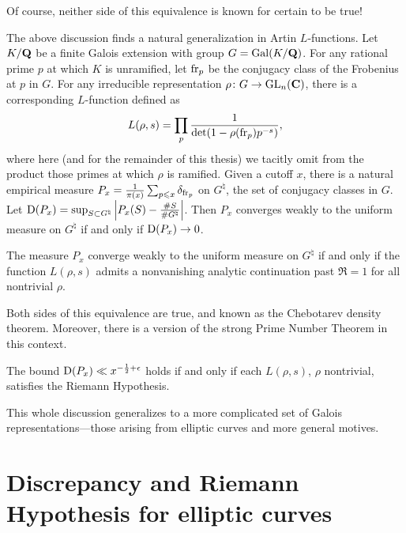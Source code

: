 Of course, neither side of this equivalence is known for certain to be true! 

The above discussion finds a natural generalization in Artin $L$-functions. 
Let $K/\mathbf{Q}$ be a finite Galois extension with group $G=\operatorname{Gal}(K/\mathbf{Q})$. For any 
rational prime $p$ at which $K$ is unramified, let $\mathrm{fr}_p$ be the conjugacy 
class of the Frobenius at $p$ in $G$. For any irreducible representation 
$\rho\colon G\to \operatorname{GL}_n(\mathbf{C})$, there is a corresponding $L$-function defined as 
\[
	L(\rho,s) = \prod_p \frac{1}{\det(1-\rho(\mathrm{fr}_p) p^{-s})} ,
\]
where here (and for the remainder of this thesis) we tacitly omit from the 
product those primes at which $\rho$ is ramified. Given a cutoff $x$, there is 
a natural empirical measure 
$P_x = \frac{1}{\pi(x)} \sum_{p\leqslant x} \delta_{\mathrm{fr}_p}$ on 
$G^\natural$, the set of conjugacy classes in $G$. Let 
$\operatorname{D}(P_x) = \sup_{S\subset G^\natural} \left| P_x(S) - \frac{\# S}{\# G^\natural}\right|$. 
Then $P_x$ converges weakly to the uniform measure on $G^\natural$ if and 
only if $\operatorname{D}(P_x) \to 0$. 

\begin{theorem}
The measure $P_x$ converge weakly to the uniform measure on $G^\natural$ if and 
only if the function $L(\rho,s)$ admits a nonvanishing analytic continuation 
past $\Re = 1$ for all nontrivial $\rho$. 
\end{theorem}

Both sides of this equivalence are true, and known as the Chebotarev density 
theorem. Moreover, there is a version of the strong Prime Number Theorem in 
this context. 

\begin{theorem}
The bound $\operatorname{D}(P_x) \ll x^{-\frac 1 2+\epsilon}$ holds if and only if each
$L(\rho,s)$, $\rho$ nontrivial, satisfies the Riemann Hypothesis. 
\end{theorem}

This whole discussion generalizes to a more complicated set of Galois 
representations---those arising from elliptic curves and more general motives.  





\section{Discrepancy and Riemann Hypothesis for elliptic curves}


